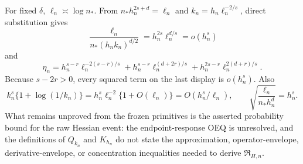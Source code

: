 For fixed \(\delta\), \(\ell_n\asymp\log n_\ast\).  From \(n_\ast h_n^{2s+d}=\ell_n\) and \(k_n=h_n\ell_n^{-2/s}\), direct substitution gives
\[
 \frac{\ell_n}{n_\ast(h_nk_n)^{d/2}}
 =h_n^{2s}\ell_n^{d/s}=o(h_n^s)
\]
and
\[
 \eta_n
 =h_n^{s-r}\ell_n^{-2(s-r)/s}
 +h_n^{s-r}\ell_n^{(d+2r)/s}
 +h_n^{2s-r}\ell_n^{2(d+r)/s}.
\]
Because \(s-2r>0\), every squared term on the last display is \(o(h_n^s)\).  Also
\[
 k_n^s\{1+\log(1/k_n)\}
 =h_n^s\ell_n^{-2}\{1+O(\ell_n)\}=O(h_n^s/\ell_n),
\qquad
 \sqrt{\frac{\ell_n}{n_\ast h_n^d}}=h_n^s.
\]
What remains unproved from the frozen primitives is the asserted probability bound for the raw Hessian event: the endpoint-response OEQ is unresolved, and the definitions of \(Q_{k_n}\) and \(K_{h_n}\) do not state the approximation, operator-envelope, derivative-envelope, or concentration inequalities needed to derive \(\mathfrak R_{H,n}\).

